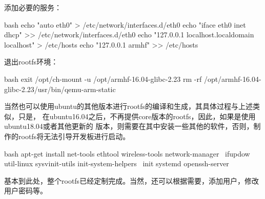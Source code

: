 添加必要的服务：
\begin{code-block}{bash}
echo "auto eth0" > /etc/network/interfaces.d/eth0
echo "iface eth0 inet dhcp" >> /etc/network/interfaces.d/eth0
echo "127.0.0.1    localhost.localdomain localhost" > /etc/hosts
echo "127.0.0.1    armhf" >> /etc/hosts
\end{code-block}

退出rootfs环境：
\begin{code-block}{bash}
exit
/opt/ch-mount -u /opt/armhf-16.04-glibc-2.23
rm -rf /opt/armhf-16.04-glibc-2.23/usr/bin/qemu-arm-static
\end{code-block}

当然也可以使用ubuntu的其他版本进行rootfs的编译和生成，其具体过程与上述类似，只是，
在ubuntu16.04之后，不再提供core版本的rootfs，因此，如果是使用ubuntu18.04或者其他更新的
版本，则需要在其中安装一些其他的软件，否则，制作的rootfs将无法引导开发板进行启动。
\begin{code-block}{bash}
apt-get install net-tools ethtool wireless-tools network-manager \
    ifupdow util-linux sysvinit-utils init-system-helpers \
    init systemd openssh-server
\end{code-block}

基本到此处，整个rootfs已经定制完成。当然，还可以根据需要，添加用户，修改用户密码等。

